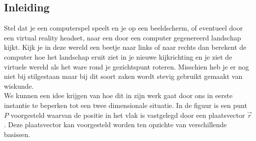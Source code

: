 \subsection*{Inleiding}

Stel dat je een computerspel speelt en je op een beeldscherm, of eventueel door een virtual reality headset, naar een door een computer gegenereerd landschap kijkt. Kijk je in deze wereld een beetje naar links of naar rechts dan berekent de computer hoe het landschap eruit ziet in je nieuwe kijkrichting en je ziet de virtuele wereld als het ware rond je gezichtspunt roteren. Misschien heb je er nog niet bij stilgestaan maar bij dit soort zaken wordt stevig gebruikt gemaakt van wiskunde.\\
We kunnen een idee krijgen van hoe dit in zijn werk gaat door ons in eerste instantie te beperken tot een twee dimensionale situatie. In de figuur is een punt $P$ voorgesteld waarvan de positie in het vlak is vastgelegd door een plaatsvector $\vec{r}$. Deze plaatsvector kan voorgesteld worden ten opzichte van verschillende basissen. 



